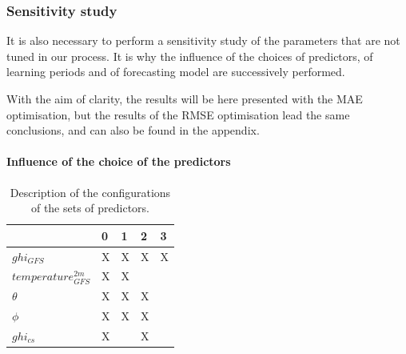 \subsubsection{Sensitivity study}
It is also necessary to perform a sensitivity study of the parameters that are not tuned in our process. It is why the influence of the choices of predictors, of learning periods 
and of forecasting model are successively performed. 

With the aim of clarity, the results will be here presented with the MAE optimisation, but the results of the RMSE optimisation lead the same conclusions, and can also
be found in the appendix.

\paragraph{Influence of the choice of the predictors}
\begin{table}[htb!]
\begin{center}
\begin{tabular}{|l|llll|}
\toprule
{} &  0 &  1 &  2 &  3 \\
\midrule
$ghi_{GFS}$            &  X &  X &  X &  X \\
$temperature^{2m}_{GFS}$ &  X &  X &    &    \\
$\theta$             &  X &  X &  X &    \\
$\phi$            &  X &  X &  X &    \\
$ghi_{cs}$             &  X &    &  X &    \\
\bottomrule
\end{tabular}
\end{center}
\label{tab:pred_configs}
\caption{Description of the configurations of the sets of predictors.}
\end{table}

